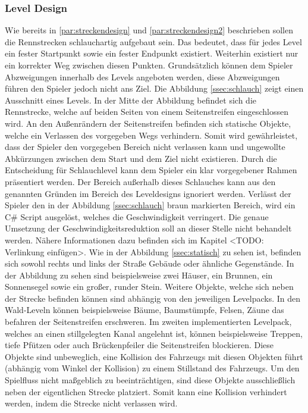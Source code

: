 	\subsubsection{Level Design}
		Wie bereits in \ref{par:streckendesign} und \ref{par:streckendesign2} beschrieben sollen die Rennstrecken schlauchartig aufgebaut sein. Das bedeutet, dass für jedes Level ein fester Startpunkt sowie ein fester Endpunkt existiert. Weiterhin existiert nur ein korrekter Weg zwischen diesen Punkten. Grundsätzlich können dem Spieler Abzweigungen innerhalb des Levels angeboten werden, diese Abzweigungen führen den Spieler jedoch nicht ans Ziel.
		Die Abbildung \ref{ssec:schlauch} zeigt einen Ausschnitt eines Levels. In der Mitte der Abbildung befindet sich die Rennstrecke, welche auf beiden Seiten von einem Seitenstreifen eingeschlossen wird. An den Außenrändern der Seitenstreifen befinden sich statische Objekte, welche ein Verlassen des vorgegeben Wegs verhindern. Somit wird gewährleistet, dass der Spieler den vorgegeben Bereich nicht verlassen kann und ungewollte Abkürzungen zwischen dem Start und dem Ziel nicht existieren. Durch die Entscheidung für Schlauchlevel kann dem Spieler ein klar vorgegebener Rahmen präsentiert werden. Der Bereich außerhalb dieses Schlauches kann aus den genannten Gründen im Bereich des Leveldesigns ignoriert werden. Verlässt der Spieler den in der Abbildung \ref{ssec:schlauch} braun markierten Bereich, wird ein C\# Script ausgelöst, welches die Geschwindigkeit verringert. Die genaue Umsetzung der Geschwindigkeitsreduktion soll an dieser Stelle nicht behandelt werden. Nähere Informationen dazu befinden sich im Kapitel <TODO: Verlinkung einfügen>.
		Wie in der Abbildung \ref{ssec:statisch} zu sehen ist, befinden sich sowohl rechts und links der Straße Gebäude oder ähnliche Gegenstände. In der Abbildung zu sehen sind beispielsweise zwei Häuser, ein Brunnen, ein Sonnensegel sowie ein großer, runder Stein. Weitere Objekte, welche sich neben der Strecke befinden können sind abhängig von den jeweiligen Levelpacks. In den Wald-Leveln können beispielsweise Bäume, Baumstümpfe, Felsen, Zäune das befahren der Seitenstreifen erschweren. Im zweiten implementierten Levelpack, welches an einen stillgelegten Kanal angelehnt ist, können beispielsweise Treppen, tiefe Pfützen oder auch Brückenpfeiler die Seitenstreifen blockieren. Diese Objekte sind unbeweglich, eine Kollision des Fahrzeugs mit diesen Objekten führt (abhängig vom Winkel der Kollision) zu einem Stillstand des Fahrzeugs. Um den Spielfluss nicht maßgeblich zu beeinträchtigen, sind diese Objekte ausschließlich neben der eigentlichen Strecke platziert. Somit kann eine Kollision verhindert werden, indem die Strecke nicht verlassen wird.
